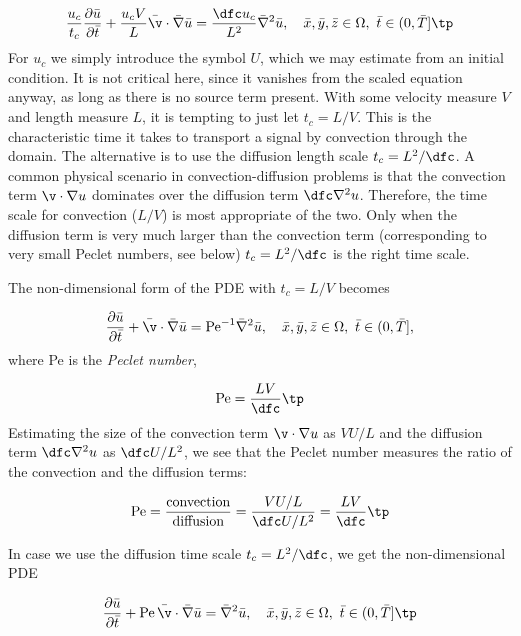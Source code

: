 \documentclass[graybox,envcountchap,sectrefs,final]{svmonodo}
\begin{document}
\[
\frac{u_c}{t_c}
\frac{\partial \bar u}{\partial \bar t} +
\frac{u_c V}{L}\bar\v\cdot\bar\nabla\bar u =
\frac{\dfc u_c}{L^2}\bar\nabla^2\bar u,
\quad \bar x,\bar y,\bar z\in \Omega,\ \bar t\in (0,\bar T]\tp
\]
For $u_c$ we simply introduce the symbol $U$, which we may estimate
from an initial condition. It is not critical here, since it vanishes
from the scaled equation anyway, as long as there is no source term
present.
With some velocity measure $V$ and length measure $L$, it is
tempting to just let $t_c = L/V$. This is the characteristic time it takes to
transport a signal by convection through the domain.
The alternative is to use the
diffusion length scale $t_c=L^2/\dfc$. A common physical scenario in
convection-diffusion problems is that
the convection term $\v\cdot\nabla u$ dominates over the
diffusion term $\dfc\nabla^2 u$. Therefore, the time scale for convection
($L/V$)
is most appropriate of the two. Only when
the diffusion term is very much larger than the convection
term (corresponding to very small Peclet numbers, see below)
$t_c=L^2/\dfc$ is the right time scale.

The non-dimensional form of the PDE with $t_c=L/V$ becomes

\begin{equation}
\frac{\partial \bar u}{\partial \bar t} +
\bar\v\cdot\bar\nabla\bar u =
\hbox{Pe}^{-1}\bar\nabla^2\bar u,
\quad \bar x,\bar y,\bar z\in \Omega,\ \bar t\in (0,\bar T],
\label{scale:convdiff:pde1:d}
\end{equation}
where Pe is the \emph{Peclet number},

\[ \hbox{Pe} = \frac{LV}{\dfc}\tp\]
Estimating the size of the convection term $\v\cdot\nabla u$ as
$VU/L$ and the diffusion term $\dfc\nabla^2 u$ as $\dfc U/L^2$,
we see that the Peclet number measures the ratio of the convection
and the diffusion terms:

\[ \hbox{Pe} = \frac{\hbox{convection}}{\hbox{diffusion}} =
\frac{VU/L}{\dfc U/L^2}= \frac{LV}{\dfc}\tp
\]

In case we use the diffusion time scale
$t_c=L^2/\dfc$, we get the non-dimensional PDE

\begin{equation}
\frac{\partial \bar u}{\partial \bar t} +
\hbox{Pe}\,\bar\v\cdot\bar\nabla\bar u =
\bar\nabla^2\bar u,
\quad \bar x,\bar y,\bar z\in \Omega,\ \bar t\in (0,\bar T]\tp
\label{scale:convdiff:pde1:d2}
\end{equation}
\end{document}
